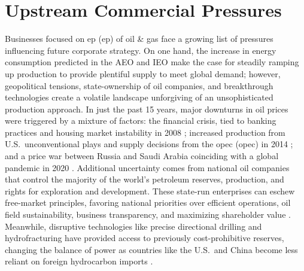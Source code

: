 \section{Upstream Commercial Pressures}\label{ch1:upstream}
Businesses focused on \acrlong{ep} (\acrshort{ep}) of oil \& gas face a growing list of pressures influencing future corporate strategy. On one hand, the increase in energy consumption predicted in the AEO and IEO make the case for steadily ramping up production to provide plentiful supply to meet global demand; however, geopolitical tensions, state-ownership of oil companies, and breakthrough technologies create a volatile landscape unforgiving of an unsophisticated production approach. In just the past 15 years, major downturns in oil prices were triggered by a mixture of factors: the financial crisis, tied to banking practices and housing market instability in 2008 \citep{singh_2007-2008_2021}; increased production from U.S.\ unconventional plays and supply decisions from the \acrlong{opec} (\acrshort{opec}) in 2014 \citep{lioudis_what_2021}; and a price war between Russia and Saudi Arabia coinciding with a global pandemic in 2020 \citep{blessing_what_2021}. Additional uncertainty comes from national oil companies that control the majority of the world’s petroleum reserves, production, and rights for exploration and development. These state-run enterprises can eschew free-market principles, favoring national priorities over efficient operations, oil field sustainability, business transparency, and maximizing shareholder value \citep{pirog_role_2007}. Meanwhile, disruptive technologies like precise directional drilling and hydrofracturing have provided access to previously cost-prohibitive reserves, changing the balance of power as countries like the U.S.\ and China become less reliant on foreign hydrocarbon imports \citep{shuen_dynamic_2014}.

